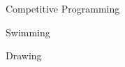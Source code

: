 

\begin{cventries}

  \cventry
    {} %
    {Competitive Programming} %
    {} %
    {} %
    {}

  \cventry
    {} %
    {Swimming} %
    {} %
    {} %
    {}

  \cventry
    {} %
    {Drawing} %
    {} %
    {} %
    {}


\end{cventries}
